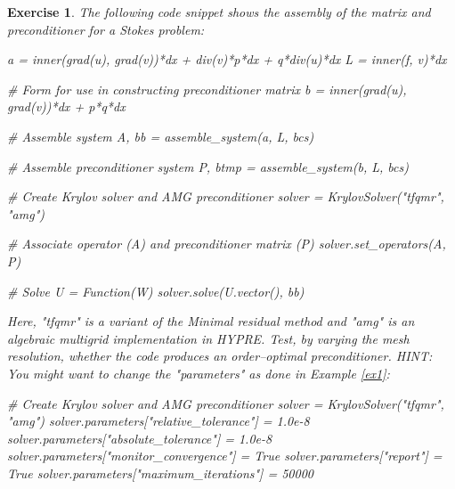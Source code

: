 \documentclass[a4paper,11pt]{amsart}
\newtheorem{exercise}{Exercise}[section]
\begin{document}
\begin{exercise}
\label{ex:stokes}
The following code snippet shows the assembly of the matrix and preconditioner
for a Stokes problem: 
\begin{python} 
a = inner(grad(u), grad(v))*dx + div(v)*p*dx + q*div(u)*dx
L = inner(f, v)*dx

# Form for use in constructing preconditioner matrix
b = inner(grad(u), grad(v))*dx + p*q*dx

# Assemble system
A, bb = assemble_system(a, L, bcs)

# Assemble preconditioner system
P, btmp = assemble_system(b, L, bcs)

# Create Krylov solver and AMG preconditioner
solver = KrylovSolver("tfqmr", "amg")

# Associate operator (A) and preconditioner matrix (P)
solver.set_operators(A, P)

# Solve
U = Function(W)
solver.solve(U.vector(), bb)
\end{python} 
Here, "tfqmr" is a variant of the Minimal residual method and "amg" is an algebraic 
multigrid implementation in HYPRE. Test, by varying the mesh resolution, whether
the code produces an order--optimal preconditioner.  
HINT: You might want to change the "parameters" as done
in Example \ref{ex1}: 
\begin{python}
# Create Krylov solver and AMG preconditioner
solver = KrylovSolver("tfqmr", "amg")
solver.parameters["relative_tolerance"] = 1.0e-8
solver.parameters["absolute_tolerance"] = 1.0e-8
solver.parameters["monitor_convergence"] = True
solver.parameters["report"] = True
solver.parameters["maximum_iterations"] = 50000
\end{python}
\end{exercise}
\end{document}

